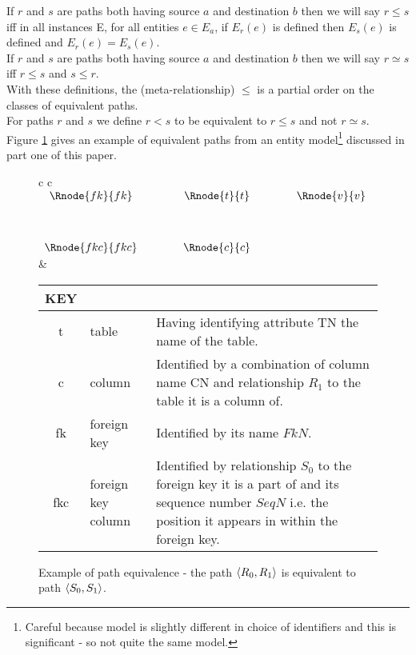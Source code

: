 \documentclass[10pt,a4paper]{article}
\begin{document}
\noindent If $r$ and $s$ are paths both having source $a$ and destination $b$ then we will say $r \leq s$ iff in all instances E, for all 
entities $e \in E_a$, if $E_r(e)$ is defined then $E_s(e)$ is defined and $E_r(e)=E_s(e)$. \\

\noindent If $r$ and $s$ are paths both having source $a$ and destination $b$ then we will say $r \simeq s$ iff $r \leq s$ and $s \leq r$. \\

\noindent With these definitions,  the (meta-relationship) $\leq$ is a partial order on the classes of equivalent paths. \\

\noindent For paths $r$ and $s$ we define $r < s$ to be equivalent to $r \leq s$ and not $r \simeq s$. \\

\noindent Figure \ref{foreignkeygraph} gives an example of equivalent paths from an entity model\footnote{Careful because model is slightly different in choice of identifiers and this is significant - so not quite the same model.} discussed in part one of this paper.

\begin{figure} [H]
\begin{center}
\begin{tabular}{c c}
$
\begin{array}{cp{0.75cm}cp{0.75cm}c}
   \Rnode{fk}{fk}     & & \Rnode{t}{t} & & \Rnode{v}{v} \\[1.2cm]     
	 \Rnode{fkc}{fkc}   & & \Rnode{c}{c} & &               
\end{array}
$
\idcomp
{} 
\idcomp
{}
\idcomp
{}
\idcomp
{}
\idcomp
{}
\idcomp
& \footnotesize
\begin{tabular}{c p{1.5cm} p{4cm}}
KEY && \\
\hline
t & table & Having identifying attribute TN the name of the table. \\
c & column & Identified by a combination of column name CN and relationship $R_1$ to the table it is a column of.\\
fk & foreign key & Identified by its name $FkN$.\\
fkc & foreign key column & Identified by relationship $S_0$ to the foreign key it is a part of and its sequence number $SeqN$ i.e. the position it appears in within the foreign key. \\
\end{tabular} 
\end{tabular}
\end{center}
\caption{Example of path equivalence - the path $\langle R_0,R_1\rangle$ is equivalent to path $\langle S_0,S_1\rangle$.}
\label{foreignkeygraph}
\end{figure}
\end{document}
